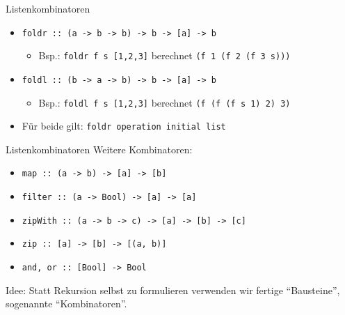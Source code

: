 \documentclass{beamer}
\begin{document}
\begin{frame}{Listenkombinatoren}
  \begin{itemize}
    \item \texttt{foldr :: (a -> b -> b) -> b -> [a] -> b}
        \begin{itemize}
            \item Bsp.: \texttt{foldr f s [1,2,3]} berechnet \texttt{(f 1 (f 2 (f 3 s)))}
        \end{itemize}
    \item \texttt{foldl :: (b -> a -> b) -> b -> [a] -> b}
        \begin{itemize} 
            \item Bsp.: \texttt{foldl f s [1,2,3]} berechnet \texttt{(f (f (f s 1) 2) 3)}
        \end{itemize}
    \item Für beide gilt: \texttt{foldr operation initial list}
  \end{itemize}
\end{frame}

\begin{frame}{Listenkombinatoren}
    Weitere Kombinatoren:
    \begin{itemize}
        \item \texttt{map :: (a -> b) -> [a] -> [b]}
        \item \texttt{filter :: (a -> Bool) -> [a] -> [a]}
        \item \texttt{zipWith :: (a -> b -> c) -> [a] -> [b] -> [c]}
        \item \texttt{zip :: [a] -> [b] -> [(a, b)]}
        \item \texttt{and, or :: [Bool] -> Bool}
    \end{itemize}
    Idee: Statt Rekursion selbst zu formulieren verwenden wir fertige \enquote{Bausteine}, sogenannte \enquote{Kombinatoren}.
\end{frame}
\end{document}
